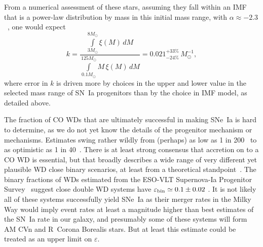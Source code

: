 \documentclass[apj]{aastex62}
\begin{document}
From a numerical assessment of these stars, assuming they fall within an IMF that is a power-law distribution by mass in this initial mass range, with $\alpha\approx-2.3$~\citep{Salpeter:1955rw,Kroupa:2001gf}, one would expect 
\begin{equation}
k = \frac{\int\limits_{3M_{\odot}}^{8M_{\odot}} \xi(M)\,dM}{\int\limits_{0.1M_{\odot}}^{125M_{\odot}} M\,\xi(M)\,dM}= 0.021^{+33\%}_{-24\%}\,M_{\odot}^{-1},
\end{equation}
\noindent where error in $k$ is driven more by choices in the upper and lower value in the selected mass range of SN~Ia progenitors than by the choice in IMF model, as detailed above.

The fraction of CO WDs that are ultimately successful in making SNe~Ia is hard to determine, as we do not yet know the details of the progenitor mechanism or mechanisms. Estimates swing rather wildly from (perhaps) as low as 1 in 200~\citep{Breedt:2017rp} to as optimistic as 1 in 40~\citep{Maoz:2012}. There is at least strong consensus that accretion on to a CO WD is essential, but that broadly describes a wide range of very different yet plausible WD close binary scenarios, at least from a theoretical standpoint~\citep{Nelemans:2001hb,Nelemans:2001cs}. The binary fractions of WDs estimated from the ESO-VLT Supernova-Ia Progenitor Survey~\citep[ SPY]{Napiwotzki:2007} suggest close double WD systems have $\varepsilon_{\rm bin}\simeq0.1\pm0.02$ \citep{Maoz:2017zl}. It is not likely all of these systems successfully yield SNe~Ia as their merger rates in the Milky Way would imply event rates at least a magnitude higher than best estimates of the SN~Ia rate in our galaxy, and presumably some of these systems will form AM CVn and R~Corona Borealis stars. But at least this estimate could be treated as an upper limit on $\varepsilon$.
\end{document}
